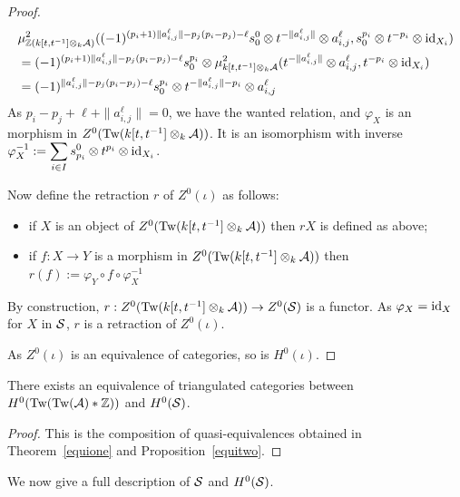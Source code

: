 \documentclass[12pt]{article}
\begin{document}
\begin{proof}
		\begin{align*}
			& \mu^2_{\mathbb{Z}(k[t,t^{-1}] \otimes_k {\cal{A}})}((-1)^{(p_i+1)\|a^\ell_{i,j}\| -p_j(p_i-p_j)-\ell}s^0_0 \otimes t^{- \|a^\ell_{i,j}\|} \otimes a^\ell_{i,j},s^{p_i}_0 \otimes t^{-p_i} \otimes \textup{id}_{X_i}) \\
			&= (-1)^{(p_i+1)\|a^\ell_{i,j}\| -p_j(p_i-p_j)-\ell}s^{p_i}_0 \otimes \mu^2_{k[t,t^{-1}] \otimes_k {\cal{A}}}(t^{- \|a^\ell_{i,j}\|} \otimes a^\ell_{i,j},t^{-p_i} \otimes \textup{id}_{X_i}) \\
			&= (-1)^{\|a^\ell_{i,j}\|  -p_j(p_i-p_j)-\ell} s^{p_i}_0 \otimes t^{-\|a^\ell_{i,j}\| - p_i} \otimes a^\ell_{i,j}
		\end{align*}
		As $p_i - p_j +\ell + \|a^\ell_{i,j}\| = 0$, we have the wanted relation, and $\varphi_X$ is an morphism in $Z^0(\textup{Tw}(k[t,t^{-1}] \otimes_k {\cal{A}}))$. It is an isomorphism with inverse $\varphi_X^{-1}:= \displaystyle\sum_{i \in I} s^0_{p_i} \otimes t^{p_i} \otimes \textup{id}_{X_i}$.
		
		Now define the retraction $r$ of $Z^0(\iota)$ as follows:
		\begin{itemize}
			\item if $X$ is an object of $Z^0(\textup{Tw}(k[t,t^{-1}] \otimes_k {\cal{A}}))$ then $rX$ is defined as above;
			\item if $f:X \to Y$ is a morphism in $Z^0(\textup{Tw}(k[t,t^{-1}] \otimes_k {\cal{A}}))$ then $r(f):= \varphi_Y \circ f\circ\varphi_X^{-1}$
		\end{itemize}
		By construction, $r:Z^0(\textup{Tw}(k[t,t^{-1}] \otimes_k {\cal{A}})) \to Z^0({\cal{S}})$ is a functor. As $\varphi_X = \textup{id}_X$ for $X$ in ${\cal{S}}$, $r$ is a retraction of $Z^0(\iota)$. 
		
		\noindent As $Z^0(\iota)$ is an equivalence of categories, so is $H^0(\iota)$.
	\end{proof}
	
	\begin{corollary}
		\label{totalequi}
		There exists an equivalence of triangulated categories between $H^0(\textup{Tw}(\textup{Tw}({\cal{A}})*\mathbb{Z}))$ and $H^0({\cal{S}})$.
	\end{corollary}
	
	\begin{proof}
		This is the composition of quasi-equivalences obtained in Theorem~\ref{equione} and Proposition~\ref{equitwo}. 
	\end{proof}

	\noindent We now give a full description of ${\cal{S}}$ and $H^0({\cal{S}})$.
	
\end{document}
